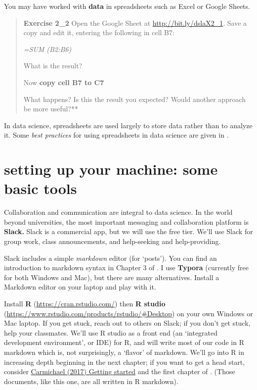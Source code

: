 \documentclass[
  openany]{book}
\begin{document}
You may have worked with \textbf{data} in spreadsheets such as Excel or Google Sheets.

\begin{quote}
\textbf{Exercise 2\_2}
Open the Google Sheet at \url{http://bit.ly/dslaX2_1}. Save a copy and edit it, entering the following in cell B7:

\emph{=SUM (B2:B6)}

What is the result?

Now \textbf{copy cell B7 to C7}

What happens? Is this the result you expected? Would another approach be more useful?**
\end{quote}

In data science, spreadsheets are used largely to store data rather than to analyze it. Some \emph{best practices} for using spreadsheets in data science are given in \citet{broman2017data}.

\hypertarget{setting-up-your-machine-some-basic-tools}{%
\section{setting up your machine: some basic tools}\label{setting-up-your-machine-some-basic-tools}}

Collaboration and communication are integral to data science. In the world beyond universities, the most important messaging and collaboration platform is \textbf{Slack.} Slack is a commercial app, but we will use the free tier. We'll use Slack for group work, class announcements, and help-seeking and help-providing.

Slack includes a simple \emph{markdown} editor (for `posts'). You can find an introduction to markdown syntax in Chapter 3 of \citet{freeman2017informatics}. I use \textbf{Typora} (currently free for both Windows and Mac), but there are many alternatives. Install a Markdown editor on your laptop and play with it.

Install \textbf{R} (\url{https://cran.rstudio.com/}) then \textbf{R studio} (\url{https://www.rstudio.com/products/rstudio/\#Desktop}) on your own Windows or Mac laptop. If you get stuck, reach out to others on Slack; if you don't get stuck, help your classmates. We'll use R studio as a front end (an `integrated development environment', or IDE) for R, and will write most of our code in R markdown which is, not surprisingly, a `flavor' of markdown. We'll go into R in increasing depth beginning in the next chapter; if you want to get a head start, consider \href{https://idc9.github.io/stor390/notes/getting_started/getting_started.html}{Carmichael (2017) Getting started} and the first chapter of \citet{wickham2016r}. (Those documents, like this one, are all written in R markdown).
\end{document}
